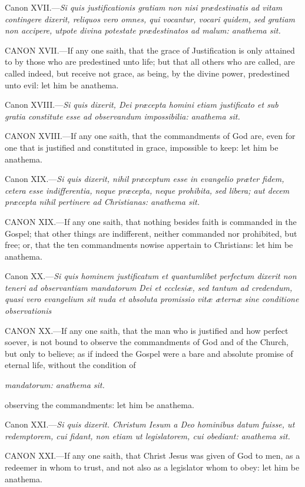 Canon XVII.—\emph{Si quis justificationis gratiam non nisi prædestinatis ad vitam contingere dixerit, reliquos vero omnes, qui vocantur, vocari quidem, sed gratiam non accipere, utpote divina potestate prædestinatos ad malum: anathema sit.}

CANON XVII.—If any one saith, that the grace of Justification is only attained to by those who are predestined unto life; but that all others who are called, are called indeed, but receive not grace, as being, by the divine power, predestined unto evil: let him be anathema.

Canon XVIII.—\emph{Si quis dixerit, Dei præcepta homini etiam justificato et sub gratia constitute esse ad observandum impossibilia: anathema sit.}

CANON XVIII.—If any one saith, that the commandments of God are, even for one that is justified and constituted in grace, impossible to keep: let him be anathema.

Canon XIX.—\emph{Si quis dixerit, nihil præceptum esse in evangelio præter fidem, cetera esse indifferentia, neque præcepta, neque prohibita, sed libera; aut decem præcepta nihil pertinere ad Christianas: anathema sit.}

CANON XIX.—If any one saith, that nothing besides faith is commanded in the Gospel; that other things are indifferent, neither commanded nor prohibited, but free; or, that the ten commandments nowise appertain to Christians: let him be anathema.

Canon XX.—\emph{Si quis hominem justificatum et quantumlibet perfectum dixerit non teneri ad observantiam mandatorum Dei et ecclesiæ, sed tantum ad credendum, quasi vero evangelium sit nuda et absoluta promissio vitæ æternæ sine conditione observationis }

CANON XX.—If any one saith, that the man who is justified and how perfect soever, is not bound to observe the commandments of God and of the Church, but only to believe; as if indeed the Gospel were a bare and absolute promise of eternal life, without the condition of

\emph{mandatorum: anathema sit.}

observing the commandments: let him be anathema.

Canon XXI.—\emph{Si quis dixerit. Christum Iesum a Deo hominibus datum fuisse, ut redemptorem, cui fidant, non etiam ut legislatorem, cui obediant: anathema sit.}

CANON XXI.—If any one saith, that Christ Jesus was given of God to men, as a redeemer in whom to trust, and not also as a legislator whom to obey: let him be anathema.

